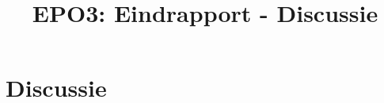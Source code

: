 \documentclass{scrartcl} %
\author{}
\title{EPO3: Eindrapport - Discussie}
\begin{document}
\chapter{Discussie}
\label{ch:discussie}
\end{document}
